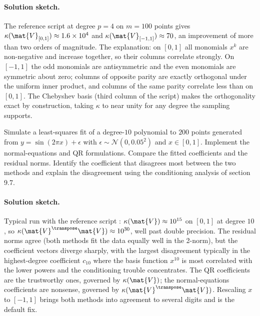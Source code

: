 \paragraph{Solution sketch.}
The reference script  at degree
$p = 4$ on $m = 100$ points gives $\kappa(\mat{V}_{[0,1]}) \approx
1.6 \times 10^{4}$ and $\kappa(\mat{V}_{[-1,1]}) \approx 70$, an
improvement of more than two orders of magnitude. The explanation:
on $[0, 1]$ all monomials $x^{k}$ are non-negative and increase
together, so their columns correlate strongly. On $[-1, 1]$ the
odd monomials are antisymmetric and the even monomials are
symmetric about zero; columns of opposite parity are exactly
orthogonal under the uniform inner product, and columns of the
same parity correlate less than on $[0, 1]$. The Chebyshev basis
(third column of the script) makes the orthogonality exact by
construction, taking $\kappa$ to near unity for any degree the
sampling supports.

\begin{exercise}
Simulate a least-squares fit of a degree-$10$ polynomial to $200$
points generated from $y = \sin(2\pi x) + \epsilon$ with
$\epsilon \sim \mathcal{N}(0, 0.05^{2})$ and $x \in [0, 1]$.
Implement the normal-equations and QR formulations. Compare the
fitted coefficients and the residual norms. Identify the
coefficient that disagrees most between the two methods and explain
the disagreement using the conditioning analysis of section 9.7.
\end{exercise}

\paragraph{Solution sketch.}
Typical run with the reference script
: $\kappa(\mat{V}) \approx
10^{15}$ on $[0, 1]$ at degree $10$, so $\kappa(\mat{V}^{\transpose}
\mat{V}) \approx 10^{30}$, well past double precision. The residual
norms agree (both methods fit the data equally well in the 2-norm),
but the coefficient vectors diverge sharply, with the largest
disagreement typically in the highest-degree coefficient $c_{10}$
where the basis function $x^{10}$ is most correlated with the
lower powers and the conditioning trouble concentrates. The QR
coefficients are the trustworthy ones, governed by $\kappa(\mat{V})$;
the normal-equations coefficients are nonsense, governed by
$\kappa(\mat{V}^{\transpose}\mat{V})$. Rescaling $x$ to $[-1, 1]$
brings both methods into agreement to several digits and is the
default fix.

